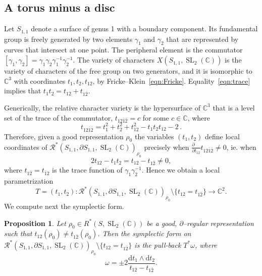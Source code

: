 \documentclass[11pt]{article}
\newtheorem{prop}[theo]{Proposition}
\theoremstyle{definition}
\numberwithin{equation}{section}
\numberwithin{figure}{section}
\numberwithin{table}{section}
\DeclareMathOperator{\SL}{SL}
\newcommand{\Rcal}{\mathcal{R}}
\newcommand{\Cbb}{\mathbb{C}}
\newcommand*{\dd}{\mathrm{d}}
\begin{document}
\subsection{A torus minus a disc}

Let $S_{1,1}$ denote a surface of genus 1 with a boundary component. Its fundamental group is freely generated by two elements $\gamma_1$ and $\gamma_2$ that are represented by curves that intersect at one point. The peripheral element is the commutator $[\gamma_1,\gamma_2]=\gamma_1\gamma_2\gamma_1^{-1}\gamma_2^{-1}$. The variety of characters $X(S_{1,1},\SL_2(\Cbb))$ is the variety of characters of the free group on two generators, and it is isomorphic to $\Cbb^3$ with coordinates $t_1,t_2,t_{12}$, by Fricke--Klein~\eqref{eqn:Fricke}. Equality~\eqref{eqn:trace} implies that $t_1t_2 = t_{12}+t_{1\bar2}$.



Generically, the relative character variety is the hypersurface of $\Cbb^3$ that is a level set of the trace of the commutator, $t_{12\bar 1\bar2}= c$ for some $c\in\Cbb$, where
\begin{equation}\label{eqn:commutator}
t_{12\bar 1\bar2} =t_1^2+t_2^2+t_{12}^2 - t_1t_2t_{12}-2 \,.
\end{equation}
Therefore, given a good representation $\rho_0$ the variables $(t_1,t_2)$ define local coordinates of $\Rcal^*(S_{1,1},\partial S_{1,1}, \SL_2(\Cbb))_{\rho_0}$ precisely when $\frac{\partial \phantom {t_{12}}}{\partial {t_{12}} } t_{12\bar 1\bar2} \neq 0$, ie. when
\begin{equation}\label{eqn:t1t2coordinates}
2 t_{12}-t_1 t_2=t_{12}-t_{1\bar 2}\neq 0,
\end{equation}
where $t_{1\bar 2}=t_{\bar 1 2}$ is the trace function of $\gamma_1\gamma_2^{-1}$. Hence we obtain a local parametrization
\[
T=(t_1,t_2)\colon \Rcal^*(S_{1,1},\partial S_{1,1}, \SL_2(\Cbb))_{\rho_0}\setminus\{t_{12}= t_{1\bar 2}\}\to\Cbb^2.
\]
We compute next the symplectic form.

\begin{prop}\label{Prop:symplectic11}
Let $\rho_0 \in R^*(S, \SL_2(\Cbb))$ be a good, $\partial$--regular representation such that $t_{12}(\rho_0)\neq t_{1\bar 2}(\rho_0)$. Then the symplectic form on $\Rcal^*(S_{1,1},\partial S_{1,1}, \SL_2(\Cbb))_{\rho_0}\setminus\{t_{12}= t_{1\bar 2}\}$ is the pull-back $T^*\omega$, where
\[
\omega=\pm 2 \frac{\dd t_1\wedge \dd t_2}{t_{12}- t_{1\bar 2}}.
\]
\end{prop}
\end{document}
